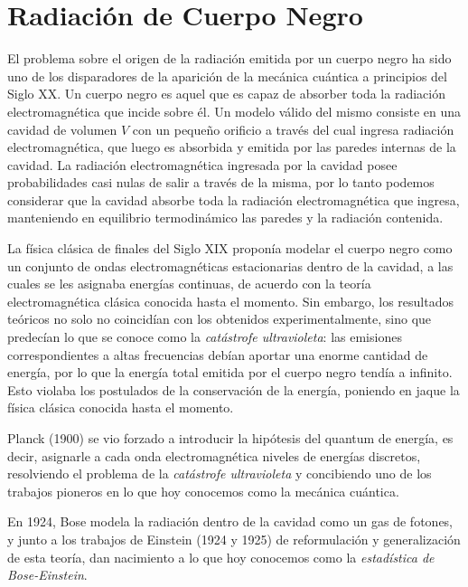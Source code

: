 \documentclass[a4paper,11pt]{article}
\begin{document}
\section{Radiación de Cuerpo Negro}

El problema sobre el origen de la radiación emitida por un cuerpo negro ha 
sido uno de los disparadores de la aparición de la mecánica cuántica a 
principios del Siglo XX.
Un cuerpo negro es aquel que es capaz de absorber toda la radiación 
electromagnética que incide sobre él.
Un modelo válido del mismo consiste en una cavidad de volumen $V$ con un 
pequeño orificio a través del cual ingresa radiación electromagnética, 
que luego es absorbida y emitida por las paredes internas de la cavidad.
La radiación electromagnética ingresada por la cavidad posee 
probabilidades casi nulas de salir a través de la misma, por lo tanto podemos 
considerar que la cavidad absorbe toda la radiación electromagnética que 
ingresa, manteniendo en equilibrio termodinámico las paredes y la radiación 
contenida.

La física clásica de finales del Siglo XIX proponía modelar el cuerpo negro 
como un conjunto de ondas electromagnéticas estacionarias dentro de la 
cavidad, a las cuales se les asignaba energías continuas, de acuerdo con la 
teoría electromagnética clásica conocida hasta el momento.
Sin embargo, los resultados teóricos no solo no coincidían con los 
obtenidos experimentalmente, sino que predecían lo que se conoce como la 
\emph{catástrofe ultravioleta}: las emisiones correspondientes a altas 
frecuencias debían aportar una enorme cantidad de energía, por lo que la 
energía total emitida por el cuerpo negro tendía a infinito.
Esto violaba los postulados de la conservación de la energía, poniendo en 
jaque la física clásica conocida hasta el momento.

Planck (1900) se vio forzado a introducir la hipótesis del quantum de 
energía, es decir, asignarle a cada onda electromagnética niveles de 
energías discretos, resolviendo el problema de la \emph{catástrofe 
ultravioleta} y concibiendo uno de los trabajos pioneros en lo que hoy 
conocemos como la mecánica cuántica.

En 1924, Bose modela la radiación dentro de la cavidad como un gas de 
fotones, y junto a los trabajos de Einstein (1924 y 1925) de reformulación y 
generalización de esta teoría, dan nacimiento a lo que hoy conocemos como la 
\emph{estadística de Bose-Einstein}.
\end{document}

